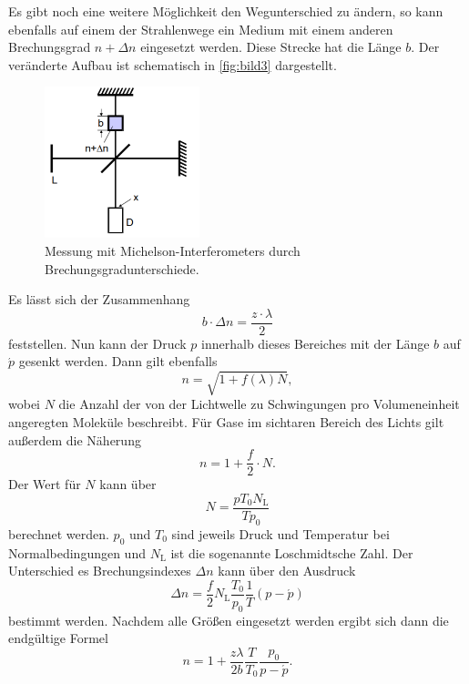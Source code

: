 Es gibt noch eine weitere Möglichkeit den Wegunterschied zu ändern, so kann ebenfalls auf einem der Strahlenwege ein Medium mit einem anderen Brechungsgrad $n + \Delta n$ eingesetzt werden.
Diese Strecke hat die Länge $b$. 
Der veränderte Aufbau ist schematisch in \autoref{fig:bild3} dargestellt.

\begin{figure}
    \centering
    \includegraphics[width=0.4\textwidth]{images/bild3.png}
    \caption{Messung mit Michelson-Interferometers durch Brechungsgradunterschiede.\cite{V401}}
    \label{fig:bild3}
\end{figure}

Es lässt sich der Zusammenhang 
\begin{equation}
    b \cdot \Delta n = \frac{z \cdot \lambda}{2}
\end{equation}
feststellen.
Nun kann der Druck $p$ innerhalb dieses Bereiches mit der Länge $b$ auf $\acute{p}$ gesenkt werden.
Dann gilt ebenfalls
\begin{equation}
    n = \sqrt{1 + f(\lambda)N},
\end{equation}
wobei $N$ die Anzahl der von der Lichtwelle zu Schwingungen pro Volumeneinheit angeregten Moleküle beschreibt.
Für Gase im sichtaren Bereich des Lichts gilt außerdem die Näherung
\begin{equation}
    n = 1 + \frac{f}{2} \cdot N.
\end{equation}
Der Wert für $N$ kann über
\begin{equation}
    N = \frac{p T_0 N_\text{L}}{T p_0}
\end{equation}
berechnet werden.
$p_0$ und $T_0$ sind jeweils Druck und Temperatur bei Normalbedingungen und $N_\text{L}$ ist die sogenannte  Loschmidtsche Zahl.
Der Unterschied es Brechungsindexes $\Delta n$ kann über den Ausdruck
\begin{equation}
    \Delta n = \frac{f}{2} N_\text{L} \frac{T_0}{p_0} \frac{1}{T} (p - \acute{p})
\end{equation}
bestimmt werden.
Nachdem alle Größen eingesetzt werden ergibt sich dann die endgültige Formel
\begin{equation}
    n = 1 + \frac{z \lambda}{2  b } \frac{T}{T_0} \frac{p_0}{p - \acute{p}}.
    \label{eq:index}
\end{equation}